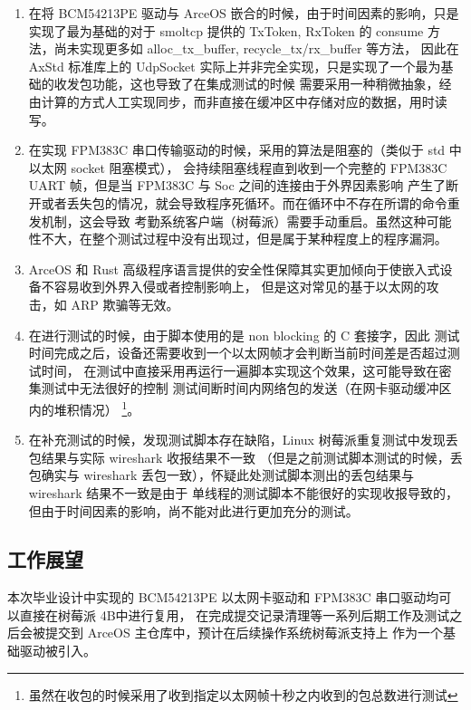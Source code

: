 \begin{enumerate}
        \item 在将 BCM54213PE 驱动与 ArceOS 嵌合的时候，由于时间因素的影响，只是实现了最为基础的对于 smoltcp 提供的
        TxToken, RxToken 的 consume 方法，尚未实现更多如 alloc\_tx\_buffer, recycle\_tx/rx\_buffer 等方法，
        因此在 AxStd 标准库上的 UdpSocket 实际上并非完全实现，只是实现了一个最为基础的收发包功能，这也导致了在集成测试的时候
        需要采用一种稍微抽象，经由计算的方式人工实现同步，而非直接在缓冲区中存储对应的数据，用时读写。

        \item 在实现 FPM383C 串口传输驱动的时候，采用的算法是阻塞的（类似于 std 中以太网 socket 阻塞模式），
            会持续阻塞线程直到收到一个完整的 FPM383C UART 帧，但是当 FPM383C 与 Soc 之间的连接由于外界因素影响
            产生了断开或者丢失包的情况，就会导致程序死循环。而在循环中不存在所谓的命令重发机制，这会导致
            考勤系统客户端（树莓派）需要手动重启。虽然这种可能性不大，在整个测试过程中没有出现过，但是属于某种程度上的程序漏洞。
        
        \item ArceOS 和 Rust 高级程序语言提供的安全性保障其实更加倾向于使嵌入式设备不容易收到外界入侵或者控制影响上，
            但是这对常见的基于以太网的攻击，如 ARP 欺骗等无效。

        \item 在进行测试的时候，由于脚本使用的是 non blocking 的 C 套接字，因此
            测试时间完成之后，设备还需要收到一个以太网帧才会判断当前时间差是否超过测试时间，
            在测试中直接采用再运行一遍脚本实现这个效果，这可能导致在密集测试中无法很好的控制
            测试间断时间内网络包的发送（在网卡驱动缓冲区内的堆积情况）
            \footnote{虽然在收包的时候采用了收到指定以太网帧十秒之内收到的包总数进行测试}。

        \item 在补充测试的时候，发现测试脚本存在缺陷，Linux 树莓派重复测试中发现丢包结果与实际 wireshark 收报结果不一致
        （但是之前测试脚本测试的时候，丢包确实与 wireshark 丢包一致），怀疑此处测试脚本测出的丢包结果与 wireshark 结果不一致是由于
        单线程的测试脚本不能很好的实现收报导致的，但由于时间因素的影响，尚不能对此进行更加充分的测试。
    \end{enumerate}

    \subsection{工作展望}

    本次毕业设计中实现的 BCM54213PE 以太网卡驱动和 FPM383C 串口驱动均可以直接在树莓派 4B中进行复用，
    在完成提交记录清理等一系列后期工作及测试之后会被提交到 ArceOS 主仓库中，预计在后续操作系统树莓派支持上
    作为一个基础驱动被引入。

